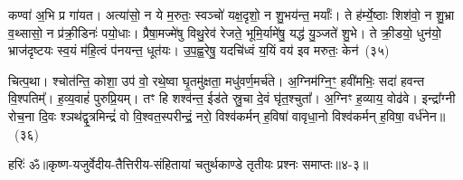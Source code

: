 कण्वा॑ अ॒भि प्र गा॑यत। अत्या॑सो॒ न ये म॒रुतः॒ स्वञ्चो॑ यक्ष॒दृशो॒ न शु॒भय॑न्त॒ मर्याः᳚। ते ह॑र्म्ये॒ष्ठाः शिश॑वो॒ न शु॒भ्रा व॒थ्सासो॒ न प्र॑क्री॒डिनः॑ पयो॒धाः। प्रैषा॒मज्मे॑षु विथु॒रेव॑ रेजते॒ भूमि॒र्यामे॑षु॒ यद्ध॑ यु॒ञ्जते॑ शु॒भे। ते क्री॒डयो॒ धुन॑यो॒ भ्राज॑दृष्टयः स्व॒यं म॑हि॒त्वं प॑नयन्त॒ धूत॑यः। उ॒प॒ह्व॒रेषु॒ यदचि॑ध्वं य॒यिं वय॑ इव मरुतः॒ केन॑~(३५)\ip

चित्प॒था। श्चोत॑न्ति॒ कोशा॒ उप॑ वो॒ रथे॒ष्वा घृ॒तमु॑क्षता॒ मधु॑वर्ण॒मर्च॑ते। अ॒ग्निम॑ग्नि॒ꣳ॒ हवी॑मभिः॒ सदा॑ हवन्त वि॒श्पतिम्᳚। ह॒व्य॒वाहं॑ पुरुप्रि॒यम्। तꣳ हि शश्व॑न्त॒ ईड॑ते स्रु॒चा दे॒वं घृ॑त॒श्चुता᳚। अ॒ग्निꣳ ह॒व्याय॒ वोढ॑वे। इन्द्रा᳚ग्नी रोच॒ना दि॒वः श्ञथ॑द्वृ॒त्रमिन्द्रं॑ वो वि॒श्वत॒स्परीन्द्रं॒ नरो॒ विश्व॑कर्मन् ह॒विषा॑ वावृधा॒नो विश्व॑कर्मन् ह॒विषा॒ वर्ध॑नेन॥~(३६)\ip

{\anuvakamend[{सूर्य॑स्य॒ मनु॑षो मरुतः॒ पाव॑क॒ महो॑भी रथे॒शुभं॒ केन॒ षट्च॑त्वारिꣳशच्च}]}%

{हरिः॑ ॐ}{॥कृष्ण-यजुर्वेदीय-तैत्तिरीय-संहितायां चतुर्थकाण्डे तृतीयः प्रश्नः समाप्तः॥४-३॥}


